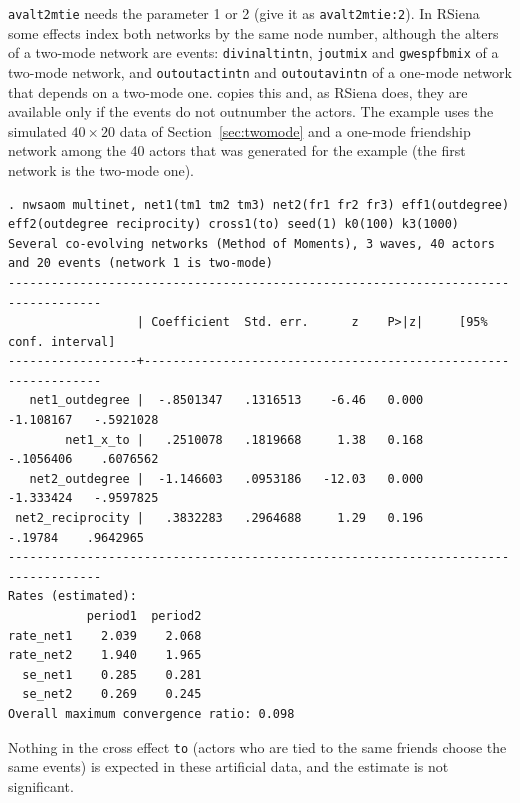\texttt{avalt2mtie} needs the parameter 1 or 2 (give it as \texttt{avalt2mtie:2}). In RSiena some effects index both networks by the same node number, although the alters of a two-mode network are events: \texttt{divinaltintn}, \texttt{joutmix} and \texttt{gwespfbmix} of a two-mode network, and \texttt{outoutactintn} and \texttt{outoutavintn} of a one-mode network that depends on a two-mode one. \nwsaom{} copies this and, as RSiena does, they are available only if the events do not outnumber the actors. The example uses the simulated $40\times20$ data of Section~\ref{sec:twomode} and a one-mode friendship network among the 40 actors that was generated for the example (the first network is the two-mode one).
\begin{lstlisting}
. nwsaom multinet, net1(tm1 tm2 tm3) net2(fr1 fr2 fr3) eff1(outdegree) eff2(outdegree reciprocity) cross1(to) seed(1) k0(100) k3(1000)
Several co-evolving networks (Method of Moments), 3 waves, 40 actors and 20 events (network 1 is two-mode)
-----------------------------------------------------------------------------------
                  | Coefficient  Std. err.      z    P>|z|     [95% conf. interval]
------------------+----------------------------------------------------------------
   net1_outdegree |  -.8501347   .1316513    -6.46   0.000    -1.108167   -.5921028
        net1_x_to |   .2510078   .1819668     1.38   0.168    -.1056406    .6076562
   net2_outdegree |  -1.146603   .0953186   -12.03   0.000    -1.333424   -.9597825
 net2_reciprocity |   .3832283   .2964688     1.29   0.196      -.19784    .9642965
-----------------------------------------------------------------------------------
Rates (estimated):
           period1  period2
rate_net1    2.039    2.068
rate_net2    1.940    1.965
  se_net1    0.285    0.281
  se_net2    0.269    0.245
Overall maximum convergence ratio: 0.098
\end{lstlisting}
Nothing in the cross effect \texttt{to} (actors who are tied to the same friends choose the same events) is expected in these artificial data, and the estimate is not significant.

